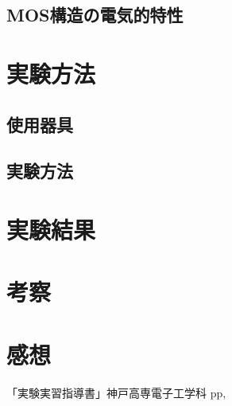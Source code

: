\documentclass[11pt]{jarticle}
\begin{document}
	\subsection{MOS構造の電気的特性}
		

\section{実験方法}
	\subsection{使用器具}
	\subsection{実験方法}
\section{実験結果}
\section{考察}
\section{感想}
\begin{thebibliography}{99}
「実験実習指導書」神戸高専電子工学科 pp,
\end{thebibliography}
\end{document}
